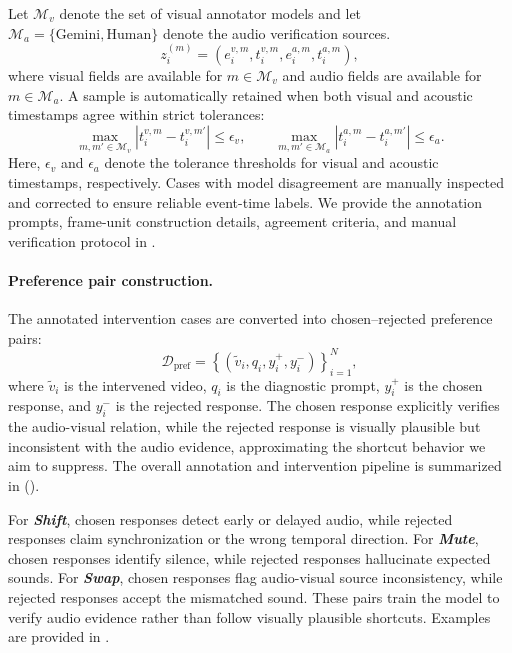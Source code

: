 \documentclass{llmxive}
\providecommand{\shift}{\textbf{\textit{Shift}}\xspace}
\providecommand{\mute}{\textbf{\textit{Mute}}\xspace}
\providecommand{\swap}{\textbf{\textit{Swap}}\xspace}
\begin{document}
Let $\mathcal{M}_v$ denote the set of visual annotator models and let $\mathcal{M}_a=\{\mathrm{Gemini}, \mathrm{Human}\}$ denote the audio verification sources.
\begin{equation}
    z_i^{(m)} = 
    \left(
    e_i^{v,m}, t_i^{v,m},
    e_i^{a,m}, t_i^{a,m}
    \right),
\end{equation}
where visual fields are available for $m \in \mathcal{M}_v$ and audio fields are available for $m \in \mathcal{M}_a$. A sample is automatically retained when both visual and acoustic timestamps agree within strict tolerances:
\begin{equation}
    \max_{m,m' \in \mathcal{M}_v}
    \left|t_i^{v,m} - t_i^{v,m'}\right|
    \leq \epsilon_v,
    \qquad
    \max_{m,m' \in \mathcal{M}_a}
    \left|t_i^{a,m} - t_i^{a,m'}\right|
    \leq \epsilon_a.
\end{equation}
Here, $\epsilon_v$ and $\epsilon_a$ denote the tolerance thresholds for visual and acoustic timestamps, respectively. Cases with model disagreement are manually inspected and corrected to ensure reliable event-time labels. We provide the annotation prompts, frame-unit construction details, agreement criteria, and manual verification protocol in .




\paragraph{Preference pair construction.}
The annotated intervention cases are converted into chosen--rejected preference pairs:
\begin{equation}
    \mathcal{D}_{\mathrm{pref}}
    =
    \left\{
    \left(
    \tilde{v}_i, q_i, y_i^+, y_i^-
    \right)
    \right\}_{i=1}^{N},
\end{equation}
where $\tilde{v}_i$ is the intervened video, $q_i$ is the diagnostic prompt, $y_i^+$ is the chosen response, and $y_i^-$ is the rejected response. The chosen response explicitly verifies the audio-visual relation, while the rejected response is visually plausible but inconsistent with the audio evidence, approximating the shortcut behavior we aim to suppress. The overall annotation and intervention pipeline is summarized in  ().

For \shift, chosen responses detect early or delayed audio, while rejected responses claim synchronization or the wrong temporal direction. For \mute, chosen responses identify silence, while rejected responses hallucinate expected sounds. For \swap, chosen responses flag audio-visual source inconsistency, while rejected responses accept the mismatched sound. These pairs train the model to verify audio evidence rather than follow visually plausible shortcuts. Examples are provided in .
\end{document}

